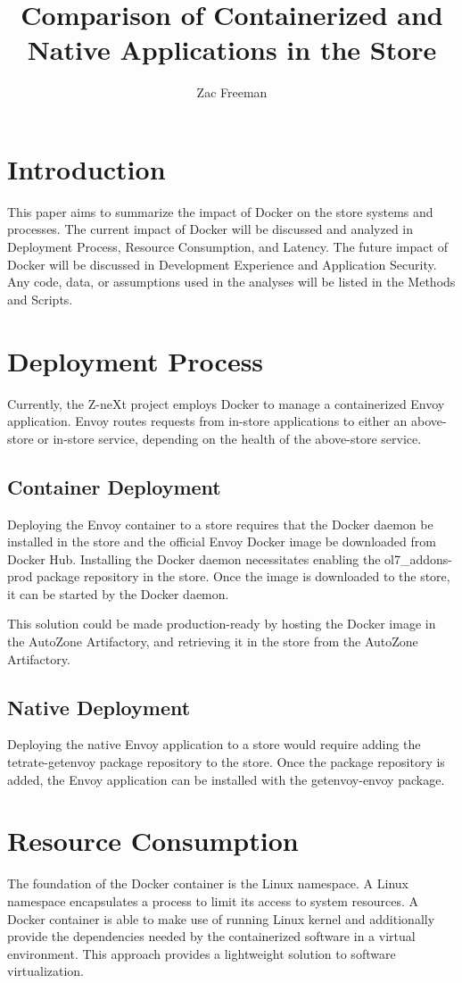 \documentclass{article}
\title{Comparison of Containerized and Native Applications in the Store}
\author{Zac Freeman}
\begin{document}
\maketitle

\section{Introduction}
This paper aims to summarize the impact of Docker on the store systems and processes. The current impact of Docker will be discussed and analyzed in Deployment Process, Resource Consumption, and Latency. The future impact of Docker will be discussed in Development Experience and Application Security. Any code, data, or assumptions used in the analyses will be listed in the Methods and Scripts.

\section{Deployment Process}
Currently, the Z-neXt project employs Docker to manage a containerized Envoy application. Envoy routes requests from in-store applications to either an above-store or in-store service, depending on the health of the above-store service.

\subsection{Container Deployment}
Deploying the Envoy container to a store requires that the Docker daemon be installed in the store and the official Envoy Docker image be downloaded from Docker Hub. Installing the Docker daemon necessitates enabling the ol7\_addons-prod package repository in the store. Once the image is downloaded to the store, it can be started by the Docker daemon.

This solution could be made production-ready by hosting the Docker image in the AutoZone Artifactory, and retrieving it in the store from the AutoZone Artifactory.

\subsection{Native Deployment}
Deploying the native Envoy application to a store would require adding the tetrate-getenvoy package repository to the store. Once the package repository is added, the Envoy application can be installed with the getenvoy-envoy package.

\section{Resource Consumption}
The foundation of the Docker container is the Linux namespace. A Linux namespace encapsulates a process to limit its access to system resources. A Docker container is able to make use of running Linux kernel and additionally provide the dependencies needed by the containerized software in a virtual environment. This approach provides a lightweight solution to software virtualization.
\end{document}
